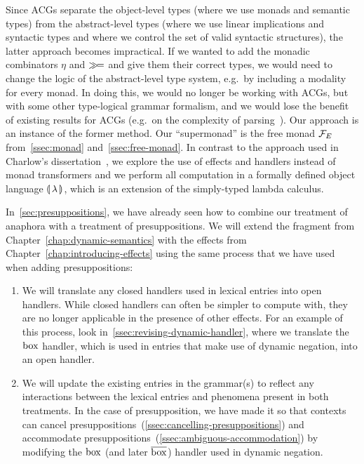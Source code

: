Since ACGs separate the object-level types (where we use monads and
semantic types) from the abstract-level types (where we use linear
implications and syntactic types and where we control the set of valid
syntactic structures), the latter approach becomes impractical. If we
wanted to add the monadic combinators $\eta$ and $\mathbin{\gg\!=}$ and give them
their correct types, we would need to change the logic of the
abstract-level type system, e.g.\ by including a modality for every
monad. In doing this, we would no longer be working with ACGs, but with
some other type-logical grammar formalism, and we would lose the benefit of
existing results for ACGs (e.g.\ on the complexity of
parsing~\cite{kanazawa2007parsing}). Our approach is an instance of the
former method. Our ``supermonad'' is the free monad $\mathcal{F}_E$
from~\ref{ssec:monad} and~\ref{ssec:free-monad}. In contrast to the
approach used in Charlow's dissertation~\cite{charlow2014semantics}, we
explore the use of effects and handlers instead of monad transformers and
we perform all computation in a formally defined object language ${\llparenthesis \, \lambda \, \rrparenthesis}$,
which is an extension of the simply-typed lambda calculus.

In~\ref{sec:presuppositions}, we have already seen how to combine our
treatment of anaphora with a treatment of presuppositions. We will extend
the fragment from Chapter~\ref{chap:dynamic-semantics} with the effects
from Chapter~\ref{chap:introducing-effects} using the same process that we
have used when adding presuppositions:

\begin{enumerate}
\item We will translate any closed handlers used in lexical entries into
  open handlers. While closed handlers can often be simpler to compute
  with, they are no longer applicable in the presence of other effects. For
  an example of this process, look in~\ref{ssec:revising-dynamic-handler},
  where we translate the $\mathrm{box}$ handler, which is used in entries that make
  use of dynamic negation, into an open handler.
\item We will update the existing entries in the grammar(s) to reflect any
  interactions between the lexical entries and phenomena present in both
  treatments. In the case of presupposition, we have made it so that
  contexts can cancel
  presuppositions~(\ref{ssec:cancelling-presuppositions}) and accommodate
  presuppositions~(\ref{ssec:ambiguous-accommodation}) by modifying the
  $\mathrm{box}$ (and later $\overline{\mathrm{box}}$) handler used in dynamic negation.
\end{enumerate}


